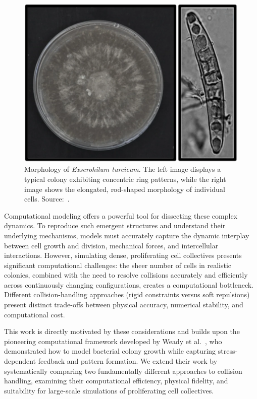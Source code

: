 \documentclass[conference]{IEEEtran}
\begin{document}
\begin{figure}[t]
    \centering
    \includegraphics[width=\linewidth]{figures/real-bacteria/Exserohilum turcicum.png}
    \caption{Morphology of \textit{Exserohilum turcicum}. The left image displays a typical colony exhibiting concentric ring patterns, while the right image shows the elongated, rod-shaped morphology of individual cells. Source:~\cite{Bankole2023}.}
    \label{fig:exserohilum_turcicum}
\end{figure}

Computational modeling offers a powerful tool for dissecting these complex dynamics. To reproduce such emergent structures and understand their underlying mechanisms, models must accurately capture the dynamic interplay between cell growth and division, mechanical forces, and intercellular interactions. However, simulating dense, proliferating cell collectives presents significant computational challenges: the sheer number of cells in realistic colonies, combined with the need to resolve collisions accurately and efficiently across continuously changing configurations, creates a computational bottleneck. Different collision-handling approaches (rigid constraints versus soft repulsions) present distinct trade-offs between physical accuracy, numerical stability, and computational cost.

This work is directly motivated by these considerations and builds upon the pioneering computational framework developed by Weady et al.~\cite{Weady2024}, who demonstrated how to model bacterial colony growth while capturing stress-dependent feedback and pattern formation. We extend their work by systematically comparing two fundamentally different approaches to collision handling, examining their computational efficiency, physical fidelity, and suitability for large-scale simulations of proliferating cell collectives.
\end{document}
